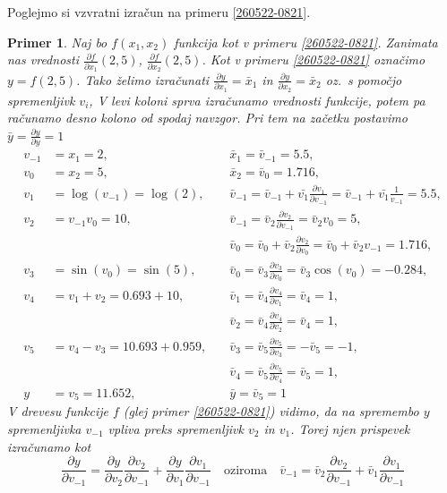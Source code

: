 \documentclass[12pt,slovene]{article}
\newtheorem{primer}{Primer}
\begin{document}
Poglejmo si vzvratni izračun na primeru \ref{260522-0821}.

\begin{primer}
Naj bo $f(x_1,x_2)$ funkcija kot v primeru \ref{260522-0821}.
Zanimata nas vrednosti $\frac{\partial f}{\partial x_1}(2,5)$, $\frac{\partial f}{\partial x_2}(2,5)$.
Kot v primeru \ref{260522-0821} označimo $y=f(2,5)$. Tako želimo izračunati $\frac{\partial{y}}{\partial x_1}=\bar x_1$ in
$\frac{\partial{y}}{\partial x_2}=\bar x_2$ 
oz.\ s pomočjo spremenljivk $v_i$, 
V levi koloni sprva izračunamo vrednosti funkcije, potem pa računamo desno kolono od spodaj navzgor. Pri tem na začetku postavimo 
$\bar{y}=\frac{\partial y}{\partial y}=1$
\begin{align*}
    v_{-1}  &=x_{1}   
    =2,\quad
    &\bar{x}_1=\bar{v}_{-1}=5.5,\\
    v_{0}     &= x_{2}  =5,\quad
    &\bar x_2=\bar{v}_{0}=1.716,\\
    v_{1}     &= \log(v_{-1})  =\log(2),\quad
    &\bar{v}_{-1}=
        \bar{v}_{-1}+
        \bar{v_1}
        \frac{\partial v_1}{\partial v_{-1}}=
        \bar{v}_{-1}+
        \bar{v_1}
        \frac{1}{v_{-1}}              =5.5,\\
    v_{2}     &= v_{-1}v_{0}  =10,\quad
    &\bar{v}_{-1}= \bar{v}_{2} 
        \frac{\partial v_2}{\partial v_{-1}}
        =\bar v_2 v_0=5,\\
    &\quad
    &\bar{v}_{0}=  \bar v_0+\bar{v}_{2} 
        \frac{\partial v_2}{\partial v_{0}}
        =\bar v_0+\bar v_2 v_{-1}=1.716,\\
    v_{3}     &= \sin(v_0)  =\sin(5),\quad
    &\bar{v}_{0}= \bar v_3\frac{\partial v_3}{\partial v_0} =\bar v_3 \cos(v_0)=-0.284,\\
    v_{4}     &= v_1+v_2  =0.693+10,\quad
    &\bar{v}_{1}= \bar{v}_4\frac{\partial v_4}{\partial v_1}=\bar v_4=1,\\
    &\quad 
    &\bar{v}_{2}= \bar v_4
    \frac{\partial v_4}{\partial v_2}=\bar v_4=1,\\
    v_{5}     &= v_4-v_3  =10.693+0.959,\quad
    &\bar{v}_{3}= \bar v_5
    \frac{\partial v_5}{\partial v_3}=-\bar v_5=-1,\\
    &\quad 
    &\bar{v}_{4}= \bar v_5
    \frac{\partial v_5}{\partial v_4}=\bar v_5=1,\\
    y&=v_5=11.652,\quad 
    &\bar{y}=\bar{v}_5=1
\end{align*}
V drevesu funkcije $f$ (glej primer \ref{260522-0821}) vidimo, da na spremembo $y$ spremenljivka $v_{-1}$ vpliva preks spremenljivk $v_2$ in $v_1$. Torej njen prispevek izračunamo kot
$$\frac{\partial y}{\partial v_{-1}}=
\frac{\partial y}{\partial v_2}
\frac{\partial v_2}{\partial v_{-1}}
+
\frac{\partial y}{\partial v_1}
\frac{\partial v_1}{\partial v_{-1}}
\quad\text{oziroma}\quad
\bar v_{-1}
=
\bar v_2
\frac{\partial v_2}{\partial v_{-1}}
+
\bar v_1
\frac{\partial v_1}{\partial v_{-1}}
$$
\end{primer}
\end{document}
